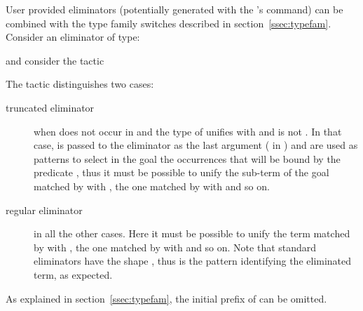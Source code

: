 User provided eliminators (potentially generated with the
 \Coq{}'s command) can be combined with the type family switches
described in section~\ref{ssec:typefam}. Consider an eliminator
 of type:


and consider the tactic


The  tactic distinguishes two cases:
\begin{description}
\item[truncated eliminator] when  does not occur in 
  and the type of  unifies with  and  is not \ssrC{_}.
  In that case,  is passed to the eliminator as the last argument
  ( in ) and  are used as patterns
  to select in the goal the occurrences that will be bound by the
  predicate , thus it must be possible to unify the sub-term of
  the goal matched by  with , the one matched by
   with  and so on.
\item[regular eliminator] in all the other cases. Here it must be
  possible to unify the term matched by
   with , the one matched by
   with  and so on. Note that
  standard eliminators have the shape , thus
   is the pattern identifying the eliminated term, as expected.
\end{description}
As explained in  section~\ref{ssec:typefam}, the initial prefix of
 can be omitted.

